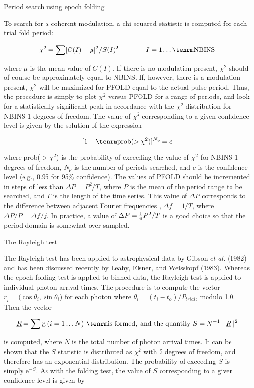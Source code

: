 \@{Period search using epoch folding}


To search for a coherent modulation, a chi-squared statistic is computed for
each trial fold period:

$$\chi^2 = \sum [C(I) - \mu]^2 / S(I)^2 \qquad\qquad I = 1 \ldots {\rm NBINS}$$

where $\mu$ is the mean value of $C(I)$.  If there is no modulation present, $\chi^2$
should of course be approximately equal to NBINS.  If, however, there is a
modulation present, $\chi^2$ will be maximized for PFOLD equal to the actual
pulse period.  Thus, the procedure is simply to plot $\chi^2$ versus PFOLD for a
range of periods, and look for a statistically significant peak in accordance
with the $\chi^2$ distribution for NBINS-1 degrees of freedom.  The value of $\chi^2$
corresponding to a given confidence level is given by the solution of the
expression

$$[1 - {\rm prob} (>\chi^2)]^{N_p} = c$$

where prob($>\chi^2$) is the probability of exceeding the value of $\chi^2$ for
NBINS-1 degrees of freedom, $N_p$ is the number of periods searched, and $c$ is
the confidence level (e.g., 0.95 for 95\% confidence).  The values of PFOLD
should be incremented in steps of less than $\Delta P = P^2/T$, where $P$ is the mean
of the period range to be searched, and $T$ is the length of the time series.
This value of $\Delta P$ corresponds to the difference between adjacent Fourier
frequencies , $\Delta f = 1/T$, where $\Delta P/P = \Delta f/f$.  In practice, a value of
$\Delta P = {1\over 4} P^2/T$ is a good choice so that the period domain is somewhat
over-sampled.

\@{The Rayleigh test}

The Rayleigh test has been applied to astrophysical data by Gibson
{\it et al.}
(1982) and has been discussed recently by Leahy, Elsner, and Weisskopf
(1983).  Whereas the epoch folding test is applied to binned data, the
Rayleigh test is applied to individual photon arrival times.  The procedure
is to compute the vector $\underline{r}_i = (\cos\theta_i, \sin\theta_i$) for each photon
where $\theta_i = (t_i - t_o)/P_{trial}$, modulo 1.0.  Then the vector

$$\underline{R} = \sum \underline{r}_i (i = 1 \ldots N)\ {\rm is\
formed,\ and\ the\ quantity}\ S = N^{-1}\mid\underline{R}\mid^2$$

is computed, where $N$ is the total number of photon arrival times.  It can be
shown that the $S$ statistic is distributed as $\chi^2$ with 2 degrees of freedom, and
therefore has an exponential distribution.  The probability of exceeding $S$ is
simply e$^{-S}$.  As with the folding test, the value of $S$ corresponding to a
given confidence level is given by

